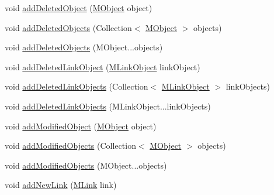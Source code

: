 \begin{DoxyCompactItemize}
\item 
void \hyperlink{classorg_1_1tzi_1_1use_1_1util_1_1soil_1_1_state_difference_a825f50dad2a1c17ca9c0a3678233e13f}{add\-Deleted\-Object} (\hyperlink{interfaceorg_1_1tzi_1_1use_1_1uml_1_1sys_1_1_m_object}{M\-Object} object)
\item 
void \hyperlink{classorg_1_1tzi_1_1use_1_1util_1_1soil_1_1_state_difference_a16162b357df60de5a447687d532abf53}{add\-Deleted\-Objects} (Collection$<$ \hyperlink{interfaceorg_1_1tzi_1_1use_1_1uml_1_1sys_1_1_m_object}{M\-Object} $>$ objects)
\item 
void \hyperlink{classorg_1_1tzi_1_1use_1_1util_1_1soil_1_1_state_difference_ae996f93ee3726be5c38d514998ff3973}{add\-Deleted\-Objects} (M\-Object...\-objects)
\item 
void \hyperlink{classorg_1_1tzi_1_1use_1_1util_1_1soil_1_1_state_difference_abae16e7a058bfeff453190424bd8d871}{add\-Deleted\-Link\-Object} (\hyperlink{interfaceorg_1_1tzi_1_1use_1_1uml_1_1sys_1_1_m_link_object}{M\-Link\-Object} link\-Object)
\item 
void \hyperlink{classorg_1_1tzi_1_1use_1_1util_1_1soil_1_1_state_difference_a8faa8cc0f2b9af34519236b93492ee75}{add\-Deleted\-Link\-Objects} (Collection$<$ \hyperlink{interfaceorg_1_1tzi_1_1use_1_1uml_1_1sys_1_1_m_link_object}{M\-Link\-Object} $>$ link\-Objects)
\item 
void \hyperlink{classorg_1_1tzi_1_1use_1_1util_1_1soil_1_1_state_difference_ac5785a6494219013ee6c36b8728d4585}{add\-Deleted\-Link\-Objects} (M\-Link\-Object...\-link\-Objects)
\item 
void \hyperlink{classorg_1_1tzi_1_1use_1_1util_1_1soil_1_1_state_difference_ae442eef364c153a85b79334715ae156f}{add\-Modified\-Object} (\hyperlink{interfaceorg_1_1tzi_1_1use_1_1uml_1_1sys_1_1_m_object}{M\-Object} object)
\item 
void \hyperlink{classorg_1_1tzi_1_1use_1_1util_1_1soil_1_1_state_difference_a45cb05ba4cbab3f76c40ed93d89a850e}{add\-Modified\-Objects} (Collection$<$ \hyperlink{interfaceorg_1_1tzi_1_1use_1_1uml_1_1sys_1_1_m_object}{M\-Object} $>$ objects)
\item 
void \hyperlink{classorg_1_1tzi_1_1use_1_1util_1_1soil_1_1_state_difference_a4bb600a4b4ead70e11e8fd67905891e8}{add\-Modified\-Objects} (M\-Object...\-objects)
\item 
void \hyperlink{classorg_1_1tzi_1_1use_1_1util_1_1soil_1_1_state_difference_ab752ecd20aca6f14fcf30ad3b2984ee2}{add\-New\-Link} (\hyperlink{interfaceorg_1_1tzi_1_1use_1_1uml_1_1sys_1_1_m_link}{M\-Link} link)
\item 

\end{DoxyCompactItemize}
